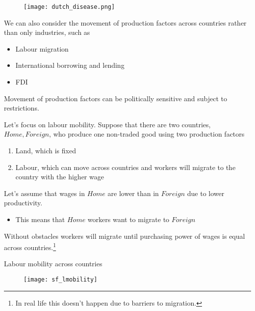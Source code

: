 \documentclass{beamer}
\begin{document}
\begin{frame}
 \begin{figure}
   \texttt{[image: dutch\_disease.png]}
 \end{figure}
\end{frame}

\begin{frame}
  We can also consider the movement of production factors across countries rather than only industries, such as   
  \begin{itemize}
    \item Labour migration
    \item International borrowing and lending
    \item FDI
  \end{itemize}
  \medskip
  Movement of production factors can be politically sensitive and subject to restrictions.
\end{frame}

\begin{frame}
Let's focus on labour mobility. 
Suppose that there are two countries, $Home,Foreign$, who produce one non-traded good using two production factors
  \begin{enumerate}
    \item Land, which is fixed
    \item Labour, which can move across countries and workers will migrate to the country with the higher wage
  \end{enumerate}
  \medskip 
  Let's assume that wages in $Home$ are lower than in $Foreign$ due to lower productivity.
  \begin{itemize}
    \item This means that $Home$ workers want to migrate to $Foreign$ 
  \end{itemize}  
  \medskip
  Without obstacles workers will migrate until purchasing power of wages is equal across countries.\footnote{In real life this doesn't happen due to barriers to migration.}  
\end{frame}

\begin{frame}{Labour mobility across countries}
  \begin{figure}
    \texttt{[image: sf\_lmobility]}
  \end{figure}
\end{frame}
\end{document}
